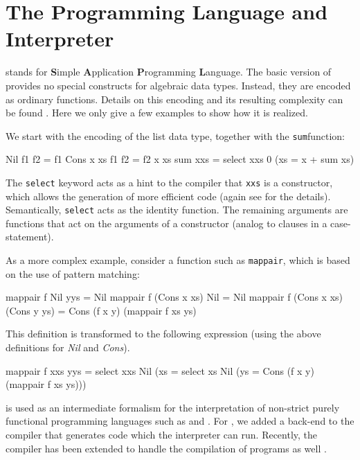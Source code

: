 \section{The \Sapl Programming Language and Interpreter}
\label{sapljs:sec:sapl}
\Sapl stands for \textbf{S}imple \textbf{A}pplication \textbf{P}rogramming
\textbf{L}anguage. The basic version of \Sapl provides no special constructs for
algebraic data types. Instead, they are encoded as ordinary functions.  Details 
on this encoding and its resulting complexity can be found \cite{JKP}.
Here we only give a few examples to show how it is realized.

We start with the encoding of the list data type, together with the \texttt{sum}function:
\begin{CleanCode}
Nil       f1  f2 = f1
Cons x xs f1  f2 = f2 x xs
sum          xxs = select xxs 0 (\x xs = x + sum xs)
\end{CleanCode}

The \texttt{select} keyword acts as a hint to the compiler that \texttt{xxs} is 
a constructor, which allows the generation of more efficient code (again see
\cite{JKP} for the details). Semantically, \texttt{select} acts as the identity
function. The remaining arguments are functions that act on the arguments of a
constructor (analog to clauses in a case-statement).

As a more complex example, consider a \Haskell function such as
\texttt{mappair}, which is based on the use of pattern matching:
  
\begin{CleanCode}
mappair f Nil          yys          = Nil 
mappair f (Cons x xs)  Nil          = Nil 
mappair f (Cons x xs)  (Cons y ys)  = Cons (f x y) (mappair f xs ys) 
\end{CleanCode}
This definition is transformed to the following \Sapl expression (using the
above definitions for \emph{Nil} and \emph{Cons}).
\begin{CleanCode}
mappair f xxs yys = select xxs Nil
                               (\x xs = select xs Nil
                                               (\y ys = Cons (f x y)
                                                             (mappair f xs ys)))
\end{CleanCode}
%
\Sapl is used as an intermediate formalism for the interpretation of non-strict
purely functional programming languages such as \Haskell and \Clean. For \Clean,
we added a \Sapl back-end to the \Clean compiler that generates \Sapl code which
the interpreter can run. Recently, the \Clean compiler has been extended to
handle the compilation of \Haskell programs as well \cite{HASCLEAN}.

